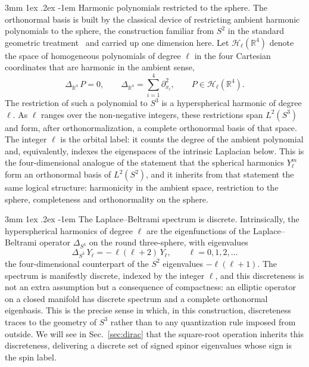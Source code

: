 \documentclass[%
 reprint, amsmath,amssymb, aps, prb, ]{revtex4-2}
\makeatletter
\numberwithin{equation}{section}
\renewcommand\paragraph{%
  \@startsection{paragraph}{4}{\z@}%
    {3mm \@plus 1ex \@minus .2ex}%
    {-1em}%
    {\normalfont\normalsize\itshape}}
\newcommand{\Rfour}{\mathbb{R}^{4}}
\makeatother
\begin{document}
\paragraph{Harmonic polynomials restricted to the sphere.}
The orthonormal basis is built by the classical device of restricting ambient harmonic polynomials to the sphere, the construction familiar from $S^{2}$ in the standard geometric treatment~\cite{Nakahara2003,SteinWeiss1971} and carried up one dimension here. Let $\mathcal{H}_{\ell}(\Rfour)$ denote the space of homogeneous polynomials of degree $\ell$ in the four Cartesian coordinates that are harmonic in the ambient sense,
\begin{equation}
\label{eq:ambient-harmonic}
\Delta_{\Rfour}\, P = 0,
\qquad
\Delta_{\Rfour} = \sum_{i=1}^{4}\partial_{x_{i}}^{2},
\qquad
P \in \mathcal{H}_{\ell}(\Rfour).
\end{equation}
The restriction of such a polynomial to $S^{3}$ is a hyperspherical harmonic of degree $\ell$. As $\ell$ ranges over the non-negative integers, these restrictions span $L^{2}(S^{3})$ and form, after orthonormalization, a complete orthonormal basis of that space. The integer $\ell$ is the orbital label: it counts the degree of the ambient polynomial and, equivalently, indexes the eigenspaces of the intrinsic Laplacian below. This is the four-dimensional analogue of the statement that the spherical harmonics $Y_{\ell}^{m}$ form an orthonormal basis of $L^{2}(S^{2})$, and it inherits from that statement the same logical structure: harmonicity in the ambient space, restriction to the sphere, completeness and orthonormality on the sphere.

\paragraph{The Laplace--Beltrami spectrum is discrete.}
Intrinsically, the hyperspherical harmonics of degree $\ell$ are the eigenfunctions of the Laplace--Beltrami operator $\Delta_{S^{3}}$ on the round three-sphere, with eigenvalues
\begin{equation}
\label{eq:lb-spectrum}
\Delta_{S^{3}}\, Y_{\ell} = -\,\ell(\ell+2)\, Y_{\ell},
\qquad
\ell = 0,1,2,\dots
\end{equation}
the four-dimensional counterpart of the $S^{2}$ eigenvalues $-\ell(\ell+1)$. The spectrum is manifestly discrete, indexed by the integer $\ell$, and this discreteness is not an extra assumption but a consequence of compactness: an elliptic operator on a closed manifold has discrete spectrum and a complete orthonormal eigenbasis. This is the precise sense in which, in this construction, discreteness traces to the geometry of $S^{3}$ rather than to any quantization rule imposed from outside. We will see in Sec.~\ref{sec:dirac} that the square-root operation inherits this discreteness, delivering a discrete set of signed spinor eigenvalues whose sign is the spin label.
\end{document}
